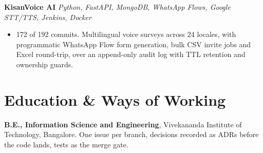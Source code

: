 \documentclass[10pt,a4paper]{article}
\begin{document}
\vspace{1pt}
\textbf{KisanVoice AI} \textit{Python, FastAPI, MongoDB, WhatsApp Flows, Google STT/TTS, Jenkins, Docker}
\begin{itemize}
  \item 172 of 192 commits. Multilingual voice surveys across 24 locales, with programmatic
        WhatsApp Flow form generation, bulk CSV invite jobs and Excel round-trip, over an
        append-only audit log with TTL retention and ownership guards.
\end{itemize}

\section{Education \& Ways of Working}
\textbf{B.E., Information Science and Engineering}, Vivekananda Institute of Technology, Bangalore.
One issue per branch, decisions recorded as ADRs before the code lands, tests as the merge gate.
\end{document}
